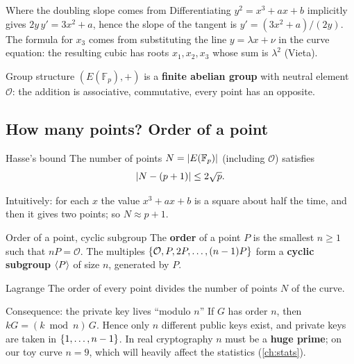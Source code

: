 \begin{framedobs}{Where the doubling slope comes from}
  Differentiating $y^2 = x^3 + ax + b$ implicitly gives $2y\, y' = 3x^2 + a$, hence the slope of the tangent is $y' = (3x^2 + a)/(2y)$. The formula for $x_3$ comes from substituting the line $y = \lambda x + \nu$ in the curve equation: the resulting cubic has roots $x_1, x_2, x_3$ whose sum is $\lambda^2$ (Vieta).
\end{framedobs}

\begin{framedthm}[label={thm:group}]{Group structure}
  $(E(\mathbb{F}_p), +)$ is a \textbf{finite abelian group} with neutral element $\mathcal{O}$: the addition is associative, commutative, every point has an opposite.
\end{framedthm}

\subsection{How many points? Order of a point}

\begin{framedthm}[label={thm:hasse}]{Hasse's bound}
  The number of points $N = \left\lvert E(\mathbb{F}_p)\right\rvert$ (including $\mathcal{O}$) satisfies
  \[
    \left\lvert N - (p+1)\right\rvert \le 2\sqrt{p}.
  \]
\end{framedthm}

Intuitively: for each $x$ the value $x^3 + ax + b$ is a square about half the time, and then it gives two points; so $N \approx p + 1$.

\begin{frameddefn}[label={def:order}]{Order of a point, cyclic subgroup}
  The \textbf{order} of a point $P$ is the smallest $n \ge 1$ such that $nP = \mathcal{O}$. The multiples $\left\{\mathcal{O}, P, 2P, \ldots, (n-1)P\right\}$ form a \textbf{cyclic subgroup} $\left\langle P \right\rangle$ of size $n$, generated by $P$.
\end{frameddefn}

\begin{framedthm}[label={thm:lagrange}]{Lagrange}
  The order of every point divides the number of points $N$ of the curve.
\end{framedthm}

\begin{framedobs}{Consequence: the private key lives ``modulo $n$''}
  If $G$ has order $n$, then $kG = (k \bmod n)\, G$. Hence only $n$ different public keys exist, and private keys are taken in $\left\{1, \ldots, n-1\right\}$. In real cryptography $n$ must be a \textbf{huge prime}; on our toy curve $n = 9$, which will heavily affect the statistics (\cref{ch:stats}).
\end{framedobs}

